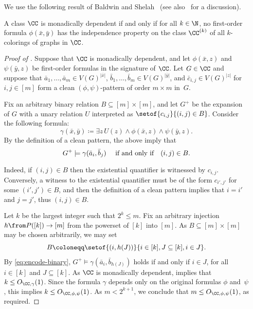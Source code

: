 We use the following result of Baldwin and Shelah~\cite[Theorem~8.1.8]{BS1985monadic} (see also~\cite[Theorem~2.58 and Proposition~2.65]{wojtekthesis} for a discussion).
\begin{theorem}\label{thm:bs}
A class $\CC$ is monadically dependent if and only if
for all $k\in\N$, no first-order formula $\phi(\bar x,\bar y)$ has the independence property on the class $\CC^{(k)}$ of all $k$-colorings of graphs in $\CC$.
\end{theorem}

\begin{proof}[Proof of ]
    Suppose that $\CC$ is monadically dependent, and let $\phi(\bar x,z)$ and $\psi(\bar y,z)$ be first-order formulas in the signature of $\CC$.
     Let $G\in\CC$ and suppose that $\bar a_1,\ldots,\bar a_m\in V(G)^{|\bar x|}$, $\bar b_1,\ldots,\bar b_m\in V(G)^{|\bar y|}$, and $\bar c_{i,j}\in V(G)^{|z|}$ for $i,j\in[m]$
       form a clean $(\phi,\psi)$-pattern of order $m\times m$ in~$G$.

    Fix an arbitrary binary relation $B\subseteq [m]\times [m]$,
and let $G^+$ be the expansion of $G$ with a unary relation $U$
interpreted as $\setof{c_{i,j}}{(i,j)\in B}$.
 Consider the following formula:
 $$\gamma(\bar x,\bar y)\coloneqq \exists z\, U(z)\land\phi(\bar x,z)\land \psi(\bar y,z).$$
 By the definition of a clean pattern, the above imply that
 \begin{align}\label{eq:encode-binary}
 G^+\models \gamma(\bar a_i,\bar b_j)\text{ \quad if and only if\quad} (i,j)\in B.
 \end{align}

 Indeed, if $(i,j)\in B$ then the existential quantifier is witnessed by $c_{i,j}$.
 Conversely, a witness to the existential quantifier must be of the form $c_{i',j'}$ for some $(i',j')\in B$, and then the definition of a clean pattern implies that
 $i=i'$ and $j=j'$, thus $(i,j)\in B$.

Let $k$ be the largest integer such that $2^k\le m$.
Fix an arbitrary injection $h\from P([k])\to [m]$ from the powerset of $[k]$ into $[m]$.
As $B\subseteq[m]\times[m]$ may be chosen arbitrarily,
we may set $$B\coloneqq \setof{(i,h(J))}{i\in[k],J\subseteq [k],i\in J}.$$
By \eqref{eq:encode-binary},
 $G^+\models\gamma(\bar a_i,\bar b_{h(J)})$ holds if and only if $i\in J$, for all $i\in[k]$ and $J\subseteq [k]$.
 As $\CC$ is monadically dependent,
  implies that $k\le O_{\CC,\gamma}(1)$.
Since the formula $\gamma$ depends only on the original formulas $\phi$ and~$\psi$, this implies $k\le O_{\CC,\phi,\psi}(1)$. As $m< 2^{k+1}$, we conclude that $m\le O_{\CC,\phi,\psi}(1)$, as required.
\end{proof}

